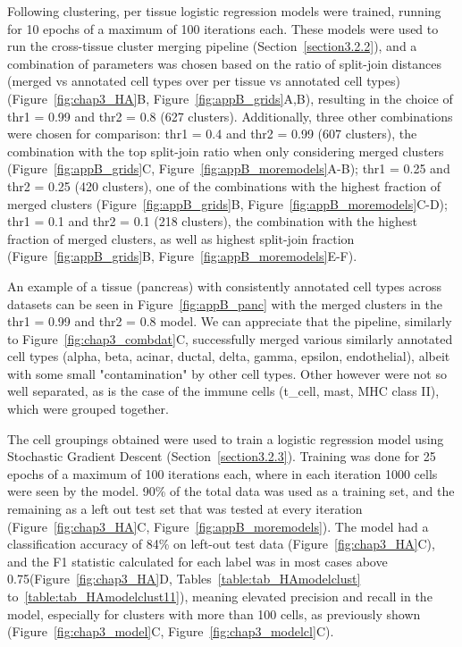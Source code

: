 Following clustering, per tissue logistic regression models were trained, running for 10 epochs of a maximum of 100 iterations each. These models were used to run the cross-tissue cluster merging pipeline (Section~\ref{section3.2.2}), and a combination of parameters was chosen based on the ratio of split-join distances (merged vs annotated cell types over per tissue vs annotated cell types) (Figure~\ref{fig:chap3_HA}B, Figure~\ref{fig:appB_grids}A,B), resulting in the choice of thr1 = 0.99 and thr2 = 0.8 (627 clusters). Additionally, three other combinations were chosen for comparison: thr1 = 0.4 and thr2 = 0.99 (607 clusters), the combination with the top split-join ratio when only considering merged clusters (Figure~\ref{fig:appB_grids}C, Figure~\ref{fig:appB_moremodels}A-B); thr1 = 0.25 and thr2 = 0.25 (420 clusters), one of the combinations with the highest fraction of merged clusters (Figure~\ref{fig:appB_grids}B, Figure~\ref{fig:appB_moremodels}C-D); thr1 = 0.1 and thr2 = 0.1 (218 clusters), the combination with the highest fraction of merged clusters, as well as highest split-join fraction (Figure~\ref{fig:appB_grids}B, Figure~\ref{fig:appB_moremodels}E-F).

An example of a tissue (pancreas) with consistently annotated cell types across datasets can be seen in Figure~\ref{fig:appB_panc} with the merged clusters in the thr1 = 0.99 and thr2 = 0.8 model. We can appreciate that the pipeline, similarly to Figure~\ref{fig:chap3_combdat}C, successfully merged various similarly annotated cell types (alpha, beta, acinar, ductal, delta, gamma, epsilon, endothelial), albeit with some small "contamination" by other cell types. Other however were not so well separated, as is the case of the immune cells (t\_cell, mast, MHC class II), which were grouped together. 

The cell groupings obtained were used to train a logistic regression model using Stochastic Gradient Descent (Section~\ref{section3.2.3}). Training was done for 25 epochs of a maximum of 100 iterations each, where in each iteration 1000 cells were seen by the model. 90\% of the total data was used as a training set, and the remaining as a left out test set that was tested at every iteration (Figure~\ref{fig:chap3_HA}C, Figure~\ref{fig:appB_moremodels}). The model had a classification accuracy of 84\% on left-out test data (Figure~\ref{fig:chap3_HA}C), and the F1 statistic calculated for each label was in most cases above 0.75(Figure~\ref{fig:chap3_HA}D, Tables~\ref{table:tab_HAmodelclust} to~\ref{table:tab_HAmodelclust11}), meaning elevated precision and recall in the model, especially for clusters with more than 100 cells, as previously shown (Figure~\ref{fig:chap3_model}C, Figure~\ref{fig:chap3_modelcl}C).

